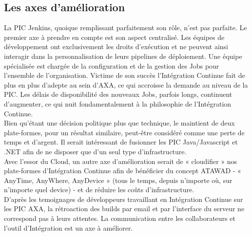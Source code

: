     \subsection{Les axes d'amélioration}
    La PIC Jenkins, quoique remplissant parfaitement son rôle, n'est pas parfaite. Le premier axe à prendre en compte est son aspect centralisé. Les équipes de développement ont exclusivement les droits d'exécution et ne peuvent ainsi interagir dans la personnalisation de leurs pipelines de déploiement. Une équipe spécialisée est chargée de la configuration et de la gestion des Jobs pour l'ensemble de l'organisation. Victime de son succès l'Intégration Continue fait de plus en plus d'adepte au sein d'AXA, ce qui accroisse la demande au niveau de la PIC. Les délais de disponibilité des nouveaux Jobs, parfois longs, continuent d'augmenter, ce qui nuit fondamentalement à la philosophie de l'Intégration Continue.\\

    Bien qu'étant une décision politique plus que technique, le maintient de deux plate-formes, pour un résultat similaire, peut-être considéré comme une perte de temps et d'argent. Il serait intéressant de fusionner les PIC Java/Javascript et .NET afin de ne disposer que d'un seul type d'infrastructure.\\

    Avec l'essor du Cloud, un autre axe d'amélioration serait de « cloudifier » nos plate-formes d'Intégration Continue afin de bénéficier du concept ATAWAD - « AnyTime, AnyWhere, AnyDevice » (tous le temps, depuis n'importe où, sur n'importe quel device) - et de réduire les coûts d'infrastructure.\\

    D'après les temoignages de développeurs travaillant en Intégration Continue sur les PIC AXA, la rétroaction des builds par email et par l'interface du serveur ne correspond pas à leurs attentes. La communication entre les collaborateurs et l'outil d'Intégration est un axe à améliorer.
